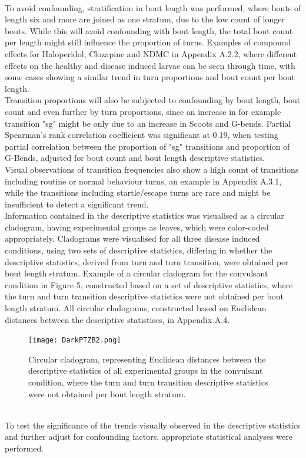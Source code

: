 \documentclass[a4paper,12pt]{article}
\begin{document}
\\To avoid confounding, stratification in bout length was performed, where bouts of length six and more are joined as one stratum, due to the low count of longer bouts.
While this will avoid confounding with bout length, the total bout count per length might still influence the proportion of turns. Examples of compound effects for Haloperidol, Clozapine and NDMC in Appendix A.2.2, where different effects on the healthy and disease induced larvae can be seen through time, with some cases showing a similar trend in turn proportions and bout count per bout length.
\\Transition proportions will also be subjected to confounding by bout length, bout count and even further by turn proportions, since an increase in for example transition "sg" might be only due to an increase in Scoots and G-bends. Partial Spearman's rank correlation coefficient was significant at 0.19, when testing partial correlation between the proportion of "sg" transitions and proportion of G-Bends, adjusted for bout count and bout length descriptive statistics. \\Visual observations of transition frequencies also show a high count of transitions including routine or normal behaviour turns, an example in Appendix A.3.1, while the transitions including startle/escape turns are rare and might be insufficient to detect a significant trend.
\\Information contained in the descriptive statistics was  visualised as a circular cladogram, having experimental groups as leaves, which were color-coded appropriately. Cladograms were  visualised for all three disease induced conditions, using two sets of descriptive statistics, differing in whether the descriptive statistics, derived from turn and turn transition, were obtained per bout length stratum. Example of a circular cladogram for the convulsant condition in Figure 5, constructed based on a set of descriptive statistics, where the turn and turn transition descriptive statistics were not obtained per bout length stratum. All circular cladograms, constructed based on Euclidean distances between the descriptive statistiscs, in Appendix A.4. 
\begin{figure}[h!]
\begin{center}
\texttt{[image: DarkPTZB2.png]}
\caption{Circular cladogram, representing Euclidean distances between the descriptive statistics of all experimental groups in the convulsant condition, where the turn and turn transition descriptive statistics were not obtained per bout length stratum.}
\end{center}
\end{figure}
\\To test the significance of the trends visually observed in the descriptive statistics and further adjust for confounding factors, appropriate statistical analyses were performed.
\end{document}

